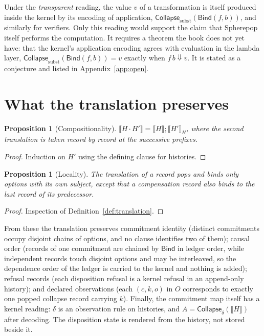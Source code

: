 \documentclass[11pt,openany]{book}
\newtheorem{proposition}[theorem]{Proposition}
\theoremstyle{remark}
\newcommand{\Bind}{\mathsf{Bind}}
\newcommand{\Collapse}{\mathsf{Collapse}}
\begin{document}
Under the \emph{transparent} reading, the value $v$ of a transformation
is itself produced inside the kernel by its encoding of application,
$\Collapse_{\mathrm{subst}}(\Bind(f,b))$, and similarly for verifiers. Only
this reading would support the claim that Spherepop itself performs the
computation. It requires a theorem the book does not yet have: that the
kernel's application encoding agrees with evaluation in the lambda layer,
$\Collapse_{\mathrm{subst}}(\Bind(f,b))=v$ exactly when $f\,b\Downarrow v$.
It is stated as a conjecture and listed in Appendix~\ref{app:open}.

\section{What the translation preserves}

\begin{proposition}[Compositionality]
$\llbracket H\cdot H'\rrbracket=\llbracket H\rrbracket;\llbracket H'\rrbracket_H$,
where the second translation is taken record by record at the successive
prefixes.
\end{proposition}

\begin{proof}
Induction on $H'$ using the defining clause for histories.
\end{proof}

\begin{proposition}[Locality]\label{prop:locality}
The translation of a record pops and binds only options with its own
subject, except that a compensation record also binds to the last record
of its predecessor.
\end{proposition}

\begin{proof}
Inspection of Definition~\ref{def:translation}.
\end{proof}

From these the translation preserves commitment identity (distinct
commitments occupy disjoint chains of options, and no clause identifies
two of them); causal order (records of one commitment are chained by
$\Bind$ in ledger order, while independent records touch disjoint options
and may be interleaved, so the dependence order of the ledger is carried to
the kernel and nothing is added); refusal records (each disposition
refusal is a kernel refusal in an append-only history); and declared
observations (each $(c,k,o)$ in $O$ corresponds to exactly one popped
collapse record carrying $k$). Finally, the commitment map itself has a
kernel reading: $\delta$ is an observation rule on histories, and
$A=\Collapse_\delta(\llbracket H\rrbracket)$ after decoding. The
disposition state is rendered from the history, not stored beside it.
\end{document}
